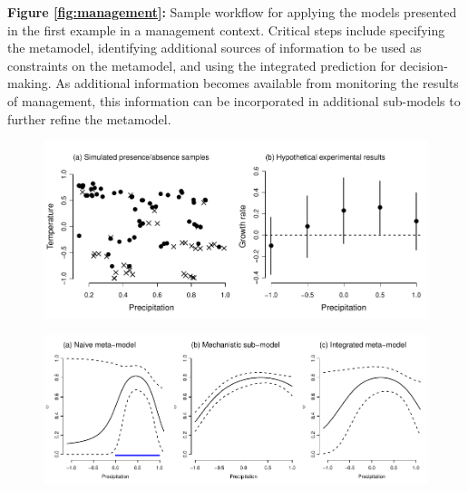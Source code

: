 \documentclass[11pt]{article}
\begin{document}
\begin{flushleft}
\textbf{Figure \ref{fig:management}:}
	Sample workflow for applying the models presented in the first example in a management context.
	Critical steps include specifying the metamodel, identifying additional sources of information to be used as constraints on the metamodel, and using the integrated prediction for decision-making.
	As additional information becomes available from monitoring the results of management, this information can be incorporated in additional sub-models to further refine the metamodel.


\end{flushleft}


\newpage
\begin{figure}[h!]

\caption{}
\label{fig:diagram}
\end{figure}


\newpage
\begin{figure}[h!]
	\includegraphics{ex1_sampling.pdf}
	\caption{}
	\label{fig:ex1_sampling}
\end{figure}


\newpage
\begin{figure}[h!]
	\includegraphics{ex1_precip.pdf}
	\caption{}
	\label{fig:ex1_precip}
\end{figure}
\end{document}
